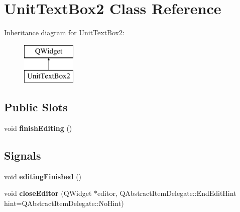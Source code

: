 \hypertarget{class_unit_text_box2}{}\section{Unit\+Text\+Box2 Class Reference}
\label{class_unit_text_box2}
Inheritance diagram for Unit\+Text\+Box2\+:\begin{figure}[H]
\begin{center}
\leavevmode
\includegraphics[height=2.000000cm]{class_unit_text_box2}
\end{center}
\end{figure}
\subsection*{Public Slots}
\begin{DoxyCompactItemize}
\item 
\mbox{\label{class_unit_text_box2_afecb704aeb6c416153160c30282bc930}} 
void {\bfseries finish\+Editing} ()
\end{DoxyCompactItemize}
\subsection*{Signals}
\begin{DoxyCompactItemize}
\item 
\mbox{\label{class_unit_text_box2_a9f527c7c8a2f62bb2d2c32dd95ab5ff6}} 
void {\bfseries editing\+Finished} ()
\item 
\mbox{\label{class_unit_text_box2_a7da04b94415dbe8eb58b7636663cdd02}} 
void {\bfseries close\+Editor} (Q\+Widget $\ast$editor, Q\+Abstract\+Item\+Delegate\+::\+End\+Edit\+Hint hint=Q\+Abstract\+Item\+Delegate\+::\+No\+Hint)
\end{DoxyCompactItemize}
